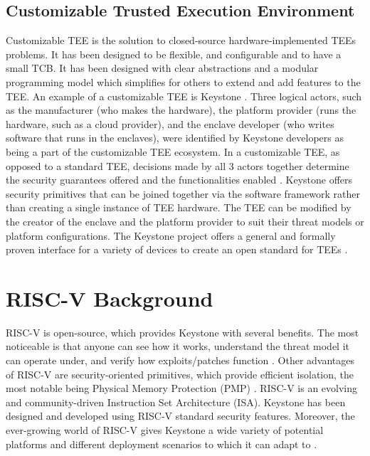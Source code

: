 \subsection{Customizable Trusted Execution Environment}
Customizable TEE is the solution to closed-source hardware-implemented TEEs problems. It has been designed to be flexible, and configurable and to have a small TCB. It has been designed with clear abstractions and a modular programming model which simplifies for others to extend and add features to the TEE. An example of a customizable TEE is Keystone \cite{lee2020keystone}. Three logical actors, such as the manufacturer (who makes the hardware), the platform provider (runs the hardware, such as a cloud provider), and the enclave developer (who writes software that runs in the enclaves), were identified by Keystone developers as being a part of the customizable TEE ecosystem. In a customizable TEE, as opposed to a standard TEE, decisions made by all 3 actors together determine the security guarantees offered and the functionalities enabled \cite{keysyone-blog-1}. 
Keystone offers security primitives that can be joined together via the software framework rather than creating a single instance of TEE hardware. The TEE can be modified by the creator of the enclave and the platform provider to suit their threat models or platform configurations. The Keystone project offers a general and formally proven interface for a variety of devices to create an open standard for TEEs \cite{lee2020keystone}. 

\section{RISC-V Background}
RISC-V \cite{risc-v-spec} is open-source, which provides Keystone with several benefits. The most noticeable is that anyone can see how it works, understand the threat model it can operate under, and verify how exploits/patches function \cite{keysyone-blog-2}.
Other advantages of RISC-V are security-oriented primitives, which provide efficient isolation, the most notable being Physical Memory Protection (PMP) \cite{pmp-sifive}. RISC-V is an evolving and community-driven Instruction Set Architecture (ISA). Keystone has been designed and developed using RISC-V standard security features. Moreover, the ever-growing world of RISC-V gives Keystone a wide variety of potential platforms and different deployment scenarios to which it can adapt to \cite{keysyone-blog-2}. 

